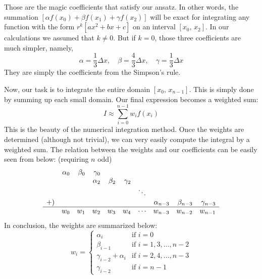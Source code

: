 Those are the magic coefficients that satisfy our ansatz.
In other words, the summation $[\alpha f(x_0) + \beta f(x_1) + \gamma f(x_2)]$
will be exact for integrating any function with the form
$r^k\left[ax^2+bx+c\right]$ on an interval $[x_0,\,x_2]$. In our calculations we
assumed that $k\ne0$. But if $k = 0$, those three coefficients are much simpler,
namely,
\begin{equation} \label{eq:abck0}
\alpha = \frac{1}{3}\Delta x,\quad \beta = \frac{4}{3}\Delta x,\quad \gamma = \frac{1}{3}\Delta x
\end{equation}
They are simply the coefficients from the Simpson's rule.

Now, our task is to integrate the entire domain
$[x_0,\,x_{n-1}]$. This is simply done by summing up
each small domain. Our final expression becomes a weighted sum:
\begin{equation} \label{eq:wSum}
I \approx \sum_{i=0}^{n-1} w_i f(x_i)
\end{equation}
This is the beauty of the numerical integration method. Once the weights are
determined (although not trivial), we can very easily compute the integral by
a weighted sum. The relation between the weights and our coefficients can be
easily seen from below: (requiring $n$ odd)
\begin{equation*}
\begin{array}{r r r r r r r r r r} 
   & \alpha_0 & \beta_0 & \gamma_0 &       &        &        &        &        & \\
   &        &       & \alpha_2 & \beta_2 & \gamma_2 &        &        &        & \\
   &        &       &        &       &        & \ddots &     &        & \\
+) &        &       &        &       &        &        & \alpha_{n-3} & \beta_{n-3} & \gamma_{n-3} \\ \hline
   & w_0    & w_1   & w_2    & w_3   & w_4 & \cdots & w_{n-3}& w_{n-2}& w_{n-1}
\end{array}
\end{equation*}
In conclusion, the weights are summarized below:
\begin{equation} \label{eq:wi}
  w_i =
  \begin{cases}
  \alpha_i & \text{if } i = 0 \\
  \beta_{i-1} & \text{if } i = 1,3,\ldots,n-2 \\
  \gamma_{i-2} + \alpha_i & \text{if } i = 2,4,\ldots,n-3 \\
  \gamma_{i-2} & \text{if } i = n-1
  \end{cases}
\end{equation}
